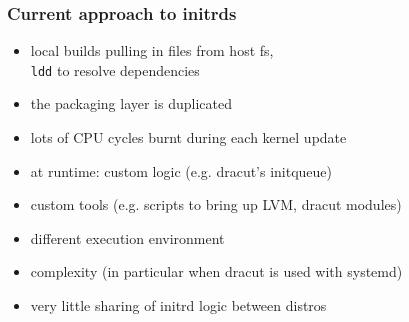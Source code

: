 \documentclass[]{beamer}
\newcommand\pp\pause
\begin{document}
\begin{frame}
  \frametitle{Current approach to initrds}




  \pp

  \begin{itemize}
  \item local builds pulling in files from host fs,\\
    \texttt{ldd} to resolve dependencies
  \pp

  \item the packaging layer is duplicated
  \pp

  \item lots of CPU cycles burnt during each kernel update
  \pp

  \quad

  \item at runtime: custom logic (e.g. dracut's initqueue)
  \pp

  \item custom tools (e.g. scripts to bring up LVM, dracut modules)
  \pp

  \item different execution environment
  \pp

  \item complexity (in particular when dracut is used with systemd)
  \pp

  \quad

  \item very little sharing of initrd logic between distros
  \end{itemize}
\end{frame}
\end{document}
